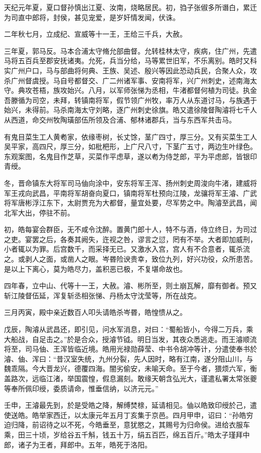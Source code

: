 \documentclass[12pt,UTF8]{ctexbook}
\begin{document}
天纪元年夏，夏口督孙慎出江夏、汝南，烧略居民。初，驺子张俶多所谮白，累迁为司直中郎将，封侯，甚见宠爱，是岁奸情发闻，伏诛。

二年秋七月，立成纪、宣威等十一王，王给三千兵，大赦。

三年夏，郭马反。马本合浦太守脩允部曲督。允转桂林太守，疾病，住广州，先遣马将五百兵至郡安抚诸夷。允死，兵当分给，马等累世旧军，不乐离别。皓时又科实广州户口，马与部曲将何典、王族、吴述、殷兴等因此恐动兵民，合聚人众，攻杀广州督虞授。马自号都督交、广二州诸军事、安南将军，兴广州刺史，述南海太守。典攻苍梧，族攻始兴。八月，以军师张悌为丞相，牛渚都督何植为司徒。执金吾滕循为司空，未拜，转镇南将军，假节领广州牧，率万人从东道讨马，与族遇于始兴，未得前。马杀南海太守刘略，逐广州刺史徐旗。皓又遣徐陵督陶濬将七千人从西道，命交州牧陶璜部伍所领及合浦、郁林诸郡兵，当与东西军共击马。

有鬼目菜生工人黄耇家，依缘枣树，长丈馀，茎广四寸，厚三分。又有买菜生工人吴平家，高四尺，厚三分，如枇杷形，上广尺八寸，下茎广五寸，两边生叶绿色。东观案图，名鬼目作芝草，买菜作平虑草，遂以耇为侍芝郎，平为平虑郎，皆银印青绶。

冬，晋命镇东大将军司马伷向涂中，安东将军王浑、扬州刺史周浚向牛渚，建威将军王戎向武昌，平南将军胡奋向夏口，镇南将军杜预向江陵，龙骧将军王濬、广武将军唐彬浮江东下，太尉贾充为大都督，量宜处要，尽军势之中。陶濬至武昌，闻北军大出，停驻不前。

初，皓每宴会群臣，无不咸令沈醉。置黄门郎十人，特不与酒，侍立终日，为司过之吏。宴罢之后，各奏其阙失，迕视之咎，谬言之愆，罔有不举。大者即加威刑，小者辄以为罪。后宫数千，而采择无已。又激水入宫，宫人有不合意者，辄杀流之。或剥人之面，或凿人之眼。岑昬险谀贵幸，致位九列，好兴功役，众所患苦。是以上下离心，莫为皓尽力，盖积恶已极，不复堪命故也。

四年春，立中山、代等十一王，大赦。濬、彬所至，则土崩瓦解，靡有御者。预又斩江陵督伍延，浑复斩丞相张悌、丹杨太守沈莹等，所在战克。

三月丙寅，殿中亲近数百人叩头请皓杀岑昬，皓惶愦从之。

戊辰，陶濬从武昌还，即引见，问水军消息，对曰：“蜀船皆小，今得二万兵，乘大船战，自足击之。”於是合众，授濬节钺。明日当发，其夜众悉逃走。而王濬顺流将至，司马伷、王浑皆临近境。皓用光禄勋薛莹、中书令胡冲等计，分遣使奉书於濬、伷、浑曰：“昔汉室失统，九州分裂，先人因时，略有江南，遂分阻山川，与魏乖隔。今大晋龙兴，德覆四海。闇劣偷安，未喻天命。至于今者，猥烦六军，衡盖路次，远临江渚，举国震惶，假息漏刻。敢缘天朝含弘光大，谨遣私署太常张夔等奉所佩印绶，委质请命，惟垂信纳，以济元元。”

壬申，王濬最先到，於是受皓之降，解缚焚榇，延请相见。伷以皓致印绶於己，遣使送皓。皓举家西迁，以太康元年五月丁亥集于京邑。四月甲申，诏曰：“孙皓穷迫归降，前诏待之以不死，今皓垂至，意犹愍之，其赐号为归命侯。进给衣服车乘，田三十顷，岁给谷五千斛，钱五十万，绢五百匹，绵五百斤。”皓太子瑾拜中郎，诸子为王者，拜郎中。五年，皓死于洛阳。
\end{document}
